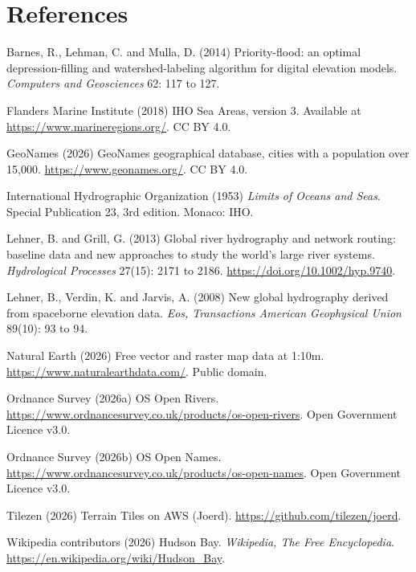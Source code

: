 \documentclass[11pt,a4paper]{article}
\begin{document}
\section*{References}
\small
\setlength{\parskip}{0.3em}
Barnes, R., Lehman, C. and Mulla, D. (2014) Priority-flood: an optimal depression-filling and watershed-labeling algorithm for digital elevation models. \emph{Computers and Geosciences} 62: 117 to 127.

Flanders Marine Institute (2018) IHO Sea Areas, version 3. Available at \url{https://www.marineregions.org/}. CC BY 4.0.

GeoNames (2026) GeoNames geographical database, cities with a population over 15,000. \url{https://www.geonames.org/}. CC BY 4.0.

International Hydrographic Organization (1953) \emph{Limits of Oceans and Seas}. Special Publication 23, 3rd edition. Monaco: IHO.

Lehner, B. and Grill, G. (2013) Global river hydrography and network routing: baseline data and new approaches to study the world's large river systems. \emph{Hydrological Processes} 27(15): 2171 to 2186. \url{https://doi.org/10.1002/hyp.9740}.

Lehner, B., Verdin, K. and Jarvis, A. (2008) New global hydrography derived from spaceborne elevation data. \emph{Eos, Transactions American Geophysical Union} 89(10): 93 to 94.

Natural Earth (2026) Free vector and raster map data at 1:10m. \url{https://www.naturalearthdata.com/}. Public domain.

Ordnance Survey (2026a) OS Open Rivers. \url{https://www.ordnancesurvey.co.uk/products/os-open-rivers}. Open Government Licence v3.0.

Ordnance Survey (2026b) OS Open Names. \url{https://www.ordnancesurvey.co.uk/products/os-open-names}. Open Government Licence v3.0.

Tilezen (2026) Terrain Tiles on AWS (Joerd). \url{https://github.com/tilezen/joerd}.

Wikipedia contributors (2026) Hudson Bay. \emph{Wikipedia, The Free Encyclopedia}. \url{https://en.wikipedia.org/wiki/Hudson_Bay}.
\end{document}
